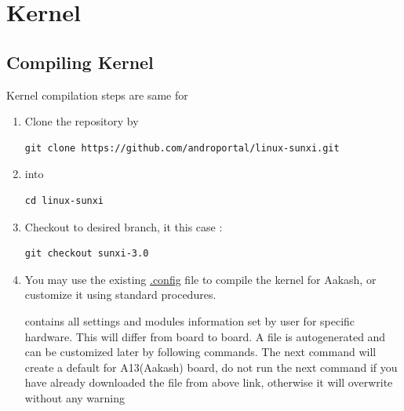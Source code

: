 \documentclass[letterpaper,10pt,english]{sphinxmanual}
\begin{document}
\begin{DUlineblock}{0em}
\item[] 
\end{DUlineblock}


\section{Kernel}
\label{embedded-linux:kernel}

\subsection{Compiling Kernel}
\label{embedded-linux:compiling-kernel}
Kernel compilation steps are same for
\begin{enumerate}
\item {} 
Clone the repository by

\begin{Verbatim}[commandchars=\\\{\}]
git clone https://github.com/androportal/linux-sunxi.git
\end{Verbatim}

\item {} 
 into 

\begin{Verbatim}[commandchars=\\\{\}]
cd linux-sunxi
\end{Verbatim}

\item {} 
Checkout to desired branch, it this case :

\begin{Verbatim}[commandchars=\\\{\}]
git checkout sunxi-3.0
\end{Verbatim}

\item {} 
You may use the existing \href{https://raw.github.com/androportal/linux-sunxi/sunxi-3.0/.config}{.config} file
to compile the kernel for Aakash, or customize it using standard procedures.

 contains all settings and modules information set by user for specific hardware. This will
differ from board to board. A  file is autogenerated and can be customized later by following
commands.
The next command will create a default  for A13(Aakash) board, do not run the next command
if you have already downloaded the  file from above link, otherwise it will overwrite without
any warning


\end{enumerate}
\end{document}
